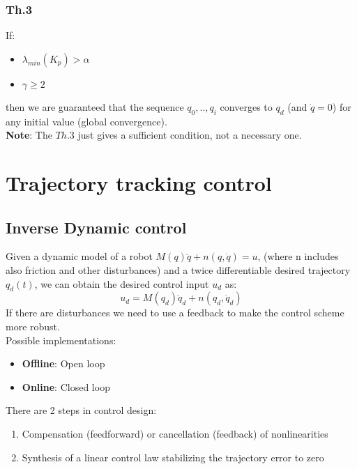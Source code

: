 \documentclass[a4paper,12pt]{article}
\begin{document}
\subsubsection{Th.3}
\label{sec:Th.3}
If:
\begin{itemize}
    \item $\lambda_{min}(K_p) > \alpha$
    \item $\gamma \geq 2$
\end{itemize}
then we are guaranteed that the sequence ${q_0,..,q_i}$ converges
 to $q_d$ (and $\dot{q}=0$)  for any initial value (global convergence).\\
\textbf{Note}: The $Th.3$ just gives a sufficient condition, not a necessary one.





\section{Trajectory tracking control}
\subsection{Inverse Dynamic control}
Given a dynamic model of a robot $M(q)\ddot{q} + n(q,\dot{q}) = u$,
(where n includes also friction and other disturbances) and a 
twice differentiable desired trajectory $q_d(t)$, we can obtain the desired 
control input $u_d$ as: \begin{equation}
    u_d = M(q_d)\ddot{q}_d + n(q_d,\dot{q}_d)
\end{equation}
If there are disturbances we need to use a feedback 
to make the control scheme more robust.\\
Possible implementations: 
\begin{itemize}
    \item \textbf{Offline}: Open loop
    \item \textbf{Online}: Closed loop
\end{itemize}
There are 2 steps in control design:
\begin{enumerate}
    \item Compensation (feedforward) or 
    cancellation (feedback) of nonlinearities
    \item Synthesis of a linear control law stabilizing
    the trajectory error to zero
\end{enumerate}
\end{document}
